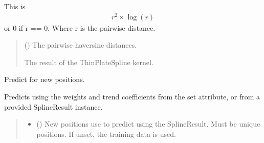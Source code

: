 \documentclass[letterpaper,10pt,english]{sphinxmanual}
\begin{document}
\begin{fulllineitems}
\begin{fulllineitems}
\sphinxAtStartPar
This is
\begin{equation*}
\begin{split}r^2 \times \log(r)\end{split}
\end{equation*}
\sphinxAtStartPar
or 0 if r == 0. Where r is the pairwise distance.
\begin{quote}\begin{description}
\sphinxAtStartPar
{} () \textendash{} The pairwise haversine distances.

\sphinxAtStartPar
The result of the ThinPlateSpline kernel.

\sphinxAtStartPar
{}

\end{description}\end{quote}

\end{fulllineitems}


\begin{fulllineitems}
\label{\detokenize{splines:glomar_gridding.spline.ThinPlateSpline.predict}}
\pysigstartsignatures
\pysiglinewithargsret
{}
{\sphinxparamcomma {}\sphinxparamcomma {}}
{}
\pysigstopsignatures
\sphinxAtStartPar
Predict for new positions.

\sphinxAtStartPar
Predicts using the weights and trend coefficients from the set 
attribute, or from a provided SplineResult instance.
\begin{quote}\begin{description}
\begin{itemize}
\item {}
\sphinxAtStartPar
{} () \textendash{} New positions use to predict using the SplineResult. Must be unique
positions. If unset, the training data is used.


\end{itemize}
\end{description}
\end{quote}
\end{fulllineitems}
\end{fulllineitems}
\end{document}
